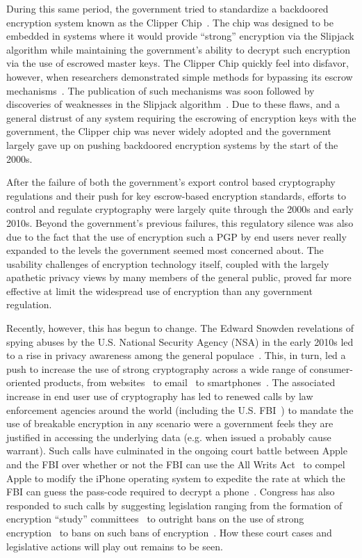 During this same period, the government tried to standardize a
backdoored encryption system known as the Clipper
Chip~\cite{whitehouse-clipper}. The chip was designed to be embedded
in systems where it would provide ``strong'' encryption via the
Slipjack algorithm while maintaining the government's ability to
decrypt such encryption via the use of escrowed master keys. The
Clipper Chip quickly feel into disfavor, however, when researchers
demonstrated simple methods for bypassing its escrow
mechanisms~\cite{blaze1994}. The publication of such mechanisms was
soon followed by discoveries of weaknesses in the Slipjack
algorithm~\cite{biham1998}. Due to these flaws, and a general distrust
of any system requiring the escrowing of encryption keys with the
government, the Clipper chip was never widely adopted and the
government largely gave up on pushing backdoored encryption systems by
the start of the 2000s.

After the failure of both the government's export control based
cryptography regulations and their push for key escrow-based
encryption standards, efforts to control and regulate cryptography
were largely quite through the 2000s and early 2010s. Beyond the
government's previous failures, this regulatory silence was also due
to the fact that the use of encryption such a PGP by end users never
really expanded to the levels the government seemed most concerned
about. The usability challenges of encryption technology itself,
coupled with the largely apathetic privacy views by many members of
the general public, proved far more effective at limit the widespread
use of encryption than any government regulation.

Recently, however, this has begun to change. The Edward Snowden
revelations of spying abuses by the U.S. National Security Agency
(NSA) in the early 2010s led to a rise in privacy awareness among the
general populace~\cite{pew-privsec14}. This, in turn, led a push to
increase the use of strong cryptography across a wide range of
consumer-oriented products, from websites~\cite{mozilla-deprecatehttp}
to email~\cite{gmail-blog-encryption} to
smartphones~\cite{ars-ios-encrypt, ars-android-encrypt}. The
associated increase in end user use of cryptography has led to renewed
calls by law enforcement agencies around the world (including the U.S.
FBI~\cite{comey-testimony-encryption}) to mandate the use of breakable
encryption in any scenario were a government feels they are justified
in accessing the underlying data (e.g. when issued a probably cause
warrant). Such calls have culminated in the ongoing court battle
between Apple and the FBI over whether or not the FBI can use the All
Writs Act~\cite{usc-allwrits} to compel Apple to modify the iPhone
operating system to expedite the rate at which the FBI can guess the
pass-code required to decrypt a phone~\cite{ars-cookvfbi}. Congress
has also responded to such calls by suggesting legislation ranging
from the formation of encryption ``study'' committees~\cite{hr4651} to
outright bans on the use of strong encryption~\cite{bennett-burrbill}
to bans on such bans of encryption~\cite{hr4528}. How these court
cases and legislative actions will play out remains to be seen.

